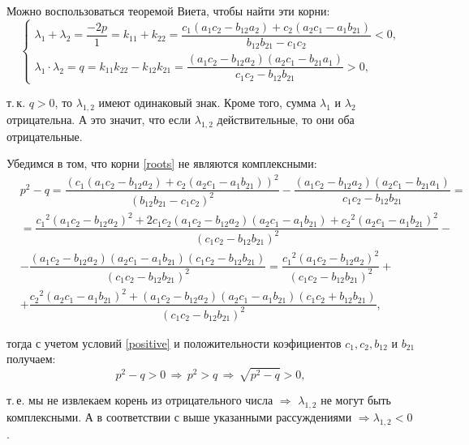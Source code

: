 \documentclass[12pt,a4paper]{article}
\begin{document}
\begin{enumerate}
        Можно воспользоваться теоремой Виета, чтобы найти эти корни:
        \[
          \begin{cases}
            \lambda_1 + \lambda_2 = \dfrac{-2 p}{1} = k_{11} + k_{22} = \dfrac{c_1 (a_1 c_2 - b_{12} a_2) + c_2 (a_2 c_1 - a_1 b_{21})}{b_{12} b_{21} - c_1 c_2} < 0,
            \\[1.5em]
            \lambda_1 \cdot \lambda_2 = q = k_{11} k_{22} - k_{12} k_{21} = \dfrac{(a_1 c_2 - b_{12} a_2)(a_2 c_1 - b_{21} a_1)}{c_1 c_2 - b_{12} b_{21}} > 0,
          \end{cases}  
        \]

        \noindent т.\,к. $ q > 0 $, то $ \lambda_{1,2} $ имеют одинаковый знак. Кроме того, сумма $ \lambda_1 $ и $ \lambda_2 $ отрицательна. А это значит, что если $ \lambda_{1, 2} $ действительные, то они оба отрицательные.
    
        Убедимся в том, что корни \eqref{roots} не являются комплексными:
        \[
            \begin{split}
                & p^2 - q = \dfrac{(c_1 (a_1 c_2 - b_{12} a_2) + c_2 (a_2 c_1 - a_1 b_{21}))^2}{(b_{12} b_{21} - c_1 c_2)^2} - \dfrac{(a_1 c_2 - b_{12} a_2)(a_2 c_1 - b_{21} a_1)}{c_1 c_2 - b_{12} b_{21}} = 
                \\[0.7em]
                & = \dfrac{{c_1}^2 (a_1 c_2 - b_{12} a_2)^2 + 2 c_1 c_2 (a_1 c_2 - b_{12} a_2) (a_2 c_1 - a_1 b_{21}) + {c_2}^2 (a_2 c_1 - a_1 b_{21})^2}{(c_1 c_2 - b_{12} b_{21})^2} -
                \\[0.7em]
                & - \dfrac{(a_1 c_2 - b_{12} a_2) (a_2 c_1 - a_1 b_{21}) (c_1 c_2 - b_{12} b_{21})}{(c_1 c_2 - b_{12} b_{21})^2} = \dfrac{{c_1}^2 (a_1 c_2 - b_{12} a_2)^2}{(c_1 c_2 - b_{12} b_{21})^2} +
                \\[0.7em]
                & + \dfrac{{c_2}^2 (a_2 c_1 - a_1 b_{21})^2 + (a_1 c_2 - b_{12} a_2) (a_2 c_1 - a_1 b_{21}) (c_1 c_2 + b_{12} b_{21})}{(c_1 c_2 - b_{12} b_{21})^2},
            \end{split}
        \]

        \noindent тогда с учетом условий \eqref{positive} и положительности коэфициентов $ c_1, c_2, b_{12} $ и $ b_{21} $ получаем:
        \[
            p^2 - q > 0 \,\Rightarrow\, p^2 > q \,\Rightarrow\, \sqrt{p^2 - q} > 0,
        \]

        \noindent т.\,е. мы не извлекаем корень из отрицательного числа $ \Rightarrow $ $ \lambda_{1,2} $ не могут быть комплексными. А в соответствии с выше указанными рассуждениями $ \Rightarrow \lambda_{1,2} < 0 $.


\end{enumerate}
\end{document}
